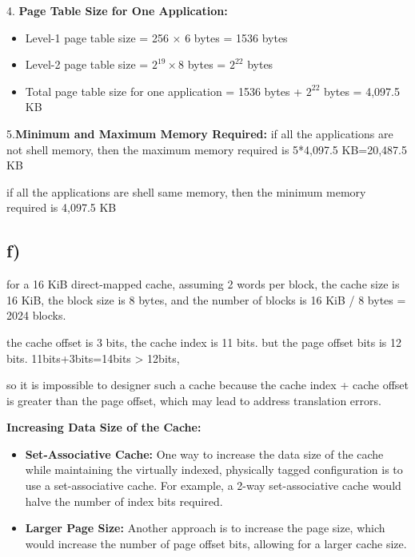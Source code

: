 \documentclass[cn,12pt]{homework}
\begin{document}
\begin{solution}
4. \textbf{Page Table Size for One Application:}
   \begin{itemize}
     \item Level-1 page table size = 256 \(\times\) 6 bytes = 1536 bytes
     \item Level-2 page table size = \(2^{19} \times 8\) bytes = \(2^{22}\) bytes 
     \item Total page table size for one application =  1536 bytes + \(2^{22}\) bytes = 4,097.5 KB
   \end{itemize}

5.\textbf{Minimum and Maximum Memory Required:}
   if all the applications are not shell memory, then the maximum memory required is 5*4,097.5 KB=20,487.5 KB

   if all the applications are shell same memory, then the minimum memory required is 4,097.5 KB

\subsection*{f)}

for a 16  KiB direct-mapped cache, assuming 2 words per block, the cache size is 16 KiB, the block size is 8 bytes, and the number of blocks is 16 KiB / 8 bytes = 2024 blocks.

the cache offset is 3 bits, the cache index is 11 bits. but the page offset bits is 12 bits.
 11bits+3bits=14bits > 12bits,
 
 so it is impossible to designer such a cache because the cache index + cache offset is greater than the page offset, which may lead to address translation errors.

\textbf{Increasing Data Size of the Cache:}
\begin{itemize}
  \item \textbf{Set-Associative Cache:} One way to increase the data size of the cache while maintaining the virtually indexed, physically tagged configuration is to use a set-associative cache. For example, a 2-way set-associative cache would halve the number of index bits required.
  \item \textbf{Larger Page Size:} Another approach is to increase the page size, which would increase the number of page offset bits, allowing for a larger cache size.
\end{itemize}
\end{solution}
\newpage
\end{document}
